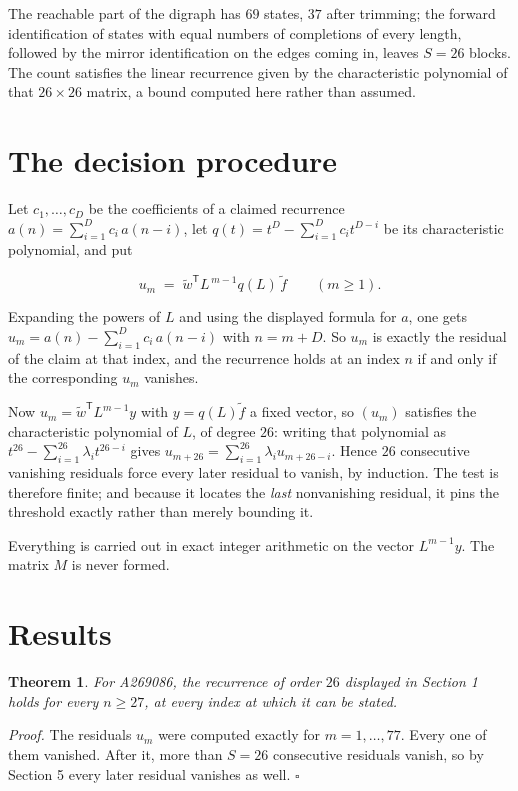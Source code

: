 \documentclass[11pt]{article}
\newtheorem{theorem}{Theorem}
\theoremstyle{definition}
\begin{document}
The reachable part of the digraph has $69$ states, $37$ after trimming; the forward identification of states with equal numbers of completions of every length, followed by the mirror identification on the edges coming in, leaves $S = 26$ blocks. The count satisfies the linear recurrence given by the characteristic polynomial of that $26\times26$ matrix, a bound computed here rather than assumed.

\section{The decision procedure}

Let $c_1,\dots,c_D$ be the coefficients of a claimed recurrence $a(n) = \sum_{i=1}^{D} c_i\,a(n-i)$, let $q(t) = t^{D} - \sum_{i=1}^{D} c_i t^{D-i}$ be its characteristic polynomial, and put

\[u_m \;=\; \tilde w^{\mathsf T} L^{\,m-1} q(L)\,\tilde f \qquad (m \ge 1).\]

Expanding the powers of $L$ and using the displayed formula for $a$, one gets $u_m = a(n) - \sum_{i=1}^{D} c_i\,a(n-i)$ with $n = m + D$. So $u_m$ is exactly the residual of the claim at that index, and the recurrence holds at an index $n$ if and only if the corresponding $u_m$ vanishes.

Now $u_m = \tilde w^{\mathsf T} L^{m-1} y$ with $y = q(L)\tilde f$ a fixed vector, so $(u_m)$ satisfies the characteristic polynomial of $L$, of degree $26$: writing that polynomial as $t^{26} - \sum_{i=1}^{26} \lambda_i t^{26-i}$ gives $u_{m+26} = \sum_{i=1}^{26} \lambda_i u_{m+26-i}$. Hence $26$ consecutive vanishing residuals force every later residual to vanish, by induction. The test is therefore finite; and because it locates the {\itshape last} nonvanishing residual, it pins the threshold exactly rather than merely bounding it.

Everything is carried out in exact integer arithmetic on the vector $L^{m-1}y$. The matrix $M$ is never formed.

\section{Results}

\begin{theorem} For A269086, the recurrence of order $26$ displayed in Section 1 holds for every $n \ge 27$, at every index at which it can be stated.\end{theorem}

{\itshape Proof.} The residuals $u_m$ were computed exactly for $m = 1,\dots,77$. Every one of them vanished. After it, more than $S = 26$ consecutive residuals vanish, so by Section 5 every later residual vanishes as well. $\square$
\end{document}
